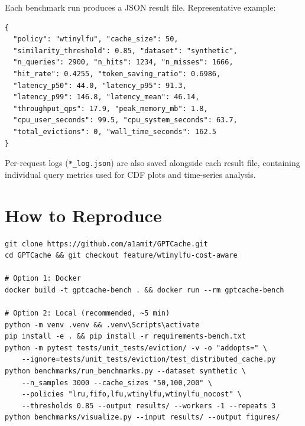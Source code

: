 \documentclass[11pt,a4paper]{article}
\begin{document}
Each benchmark run produces a JSON result file. Representative example:

\begin{lstlisting}
{
  "policy": "wtinylfu", "cache_size": 50,
  "similarity_threshold": 0.85, "dataset": "synthetic",
  "n_queries": 2900, "n_hits": 1234, "n_misses": 1666,
  "hit_rate": 0.4255, "token_saving_ratio": 0.6986,
  "latency_p50": 44.0, "latency_p95": 91.3,
  "latency_p99": 146.8, "latency_mean": 46.14,
  "throughput_qps": 17.9, "peak_memory_mb": 1.8,
  "cpu_user_seconds": 99.5, "cpu_system_seconds": 63.7,
  "total_evictions": 0, "wall_time_seconds": 162.5
}
\end{lstlisting}

\noindent Per-request logs (\texttt{*\_log.json}) are also saved alongside each result file, containing individual query metrics used for CDF plots and time-series analysis.

\section{How to Reproduce}

\begin{lstlisting}
git clone https://github.com/a1amit/GPTCache.git
cd GPTCache && git checkout feature/wtinylfu-cost-aware

# Option 1: Docker
docker build -t gptcache-bench . && docker run --rm gptcache-bench

# Option 2: Local (recommended, ~5 min)
python -m venv .venv && .venv\Scripts\activate
pip install -e . && pip install -r requirements-bench.txt
python -m pytest tests/unit_tests/eviction/ -v -o "addopts=" \
    --ignore=tests/unit_tests/eviction/test_distributed_cache.py
python benchmarks/run_benchmarks.py --dataset synthetic \
    --n_samples 3000 --cache_sizes "50,100,200" \
    --policies "lru,fifo,lfu,wtinylfu,wtinylfu_nocost" \
    --thresholds 0.85 --output results/ --workers -1 --repeats 3
python benchmarks/visualize.py --input results/ --output figures/
\end{lstlisting}
\end{document}
